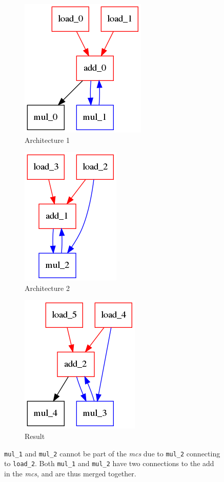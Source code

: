 \begin{figure}[!htb]
  \begin{subfigure}[t]{0.33\textwidth}
    \centering
    \includegraphics[scale=0.5]{graphs/test_leftovers1.png}
    \caption{Architecture 1}
    \label{fig:leftovers:a}
  \end{subfigure}
  \begin{subfigure}[t]{0.33\textwidth}
    \centering
    \includegraphics[scale=0.5]{graphs/test_leftovers2.png}
    \caption{Architecture 2}
    \label{fig:leftovers:b}
  \end{subfigure}
  \begin{subfigure}[t]{0.33\textwidth}
    \centering
    \includegraphics[scale=0.5]{graphs/test_leftovers.png}
    \caption{Result}
    \label{fig:leftovers:c}
  \end{subfigure}
\caption{\texttt{mul\_1} and \texttt{mul\_2} cannot be part of the \textit{mcs} due to \texttt{mul\_2} connecting to \texttt{load\_2}. Both \texttt{mul\_1} and \texttt{mul\_2} have two connections to the add in the \textit{mcs}, and are thus merged together.}
\label{fig:leftovers}
\end{figure}

